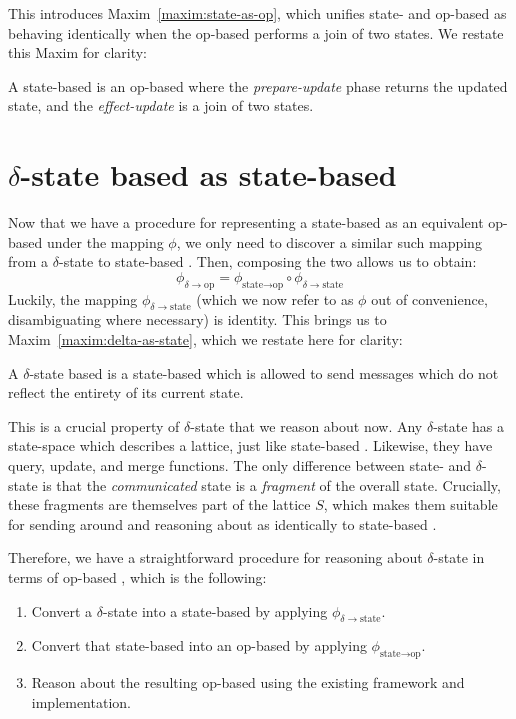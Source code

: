 This introduces Maxim~\ref{maxim:state-as-op}, which unifies state- and op-based
\CRDTs as behaving identically when the op-based \CRDT performs a join of two
states. We restate this Maxim for clarity:

\setcounter{maxim}{0}
\begin{maxim}
  A state-based \CRDT is an op-based \CRDT where the \emph{prepare-update} phase
  returns the updated state, and the \emph{effect-update} is a join of two
  states.
\end{maxim}

\section{$\delta$-state based \CRDTs as state-based}
\label{sec:delta-as-state}
Now that we have a procedure for representing a state-based \CRDT as an
equivalent op-based \CRDT under the mapping $\phi$, we only need to discover a
similar such mapping from a $\delta$-state to state-based \CRDT.  Then,
composing the two allows us to obtain:
\[
  \phi_{\delta \to \text{op}} =
    \phi_{\text{state} \to \text{op}} \circ
    \phi_{\delta \to \text{state}}
\]
Luckily, the mapping $\phi_{\delta \to \text{state}}$ (which we now refer to
as $\phi$ out of convenience, disambiguating where necessary) is identity.
This brings us to Maxim~\ref{maxim:delta-as-state}, which we restate here for
clarity:

\setcounter{maxim}{1}
\begin{maxim}
  A $\delta$-state based \CRDT is a state-based \CRDT which is allowed to send
  messages which do not reflect the entirety of its current state.
\end{maxim}

This is a crucial property of $\delta$-state \CRDTs that we reason about now. Any
$\delta$-state \CRDT has a state-space which describes a lattice, just like
state-based \CRDTs. Likewise, they have query, update, and merge functions. The
only difference between state- and $\delta$-state \CRDTs is that the
\emph{communicated} state is a \emph{fragment} of the overall state. Crucially,
these fragments are themselves part of the lattice $S$, which makes them
suitable for sending around and reasoning about as identically to state-based
\CRDTs.

Therefore, we have a straightforward procedure for reasoning about
$\delta$-state \CRDTs in terms of op-based \CRDTs, which is the following:
\begin{enumerate}
  \item Convert a $\delta$-state \CRDT into a state-based \CRDT by applying
    $\phi_{\delta \to \text{state}}$.
  \item Convert that state-based \CRDT into an op-based \CRDT by applying
    $\phi_{\text{state} \to \text{op}}$.
  \item Reason about the resulting op-based \CRDT using the existing framework
    and implementation.
\end{enumerate}

